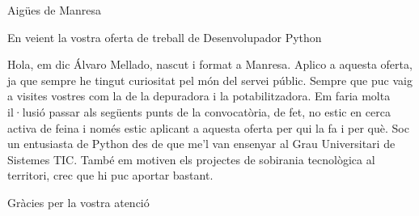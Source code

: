 \documentclass[11pt]{letter}
\date{15/04/2024}
\begin{document}
\begin{letter}{Aigües de Manresa }
\opening{En veient la vostra oferta de treball de Desenvolupador Python }

Hola, em dic Álvaro Mellado, nascut i format a Manresa. Aplico a aquesta 
oferta, ja que sempre he tingut curiositat pel món del servei públic. Sempre 
que puc vaig a visites vostres com la de la depuradora i la potabilitzadora. 
Em faria molta il·lusió passar als següents punts de la convocatòria, de fet, 
no estic en cerca activa de feina i només estic aplicant a aquesta oferta per 
qui la fa i per què. Soc un entusiasta de Python des de que me’l van ensenyar 
al Grau Universitari de Sistemes TIC. També em motiven els projectes de 
sobirania tecnològica al territori, crec que hi puc aportar bastant. 

\closing{Gràcies per la vostra atenció}
\end{letter}
\end{document}
